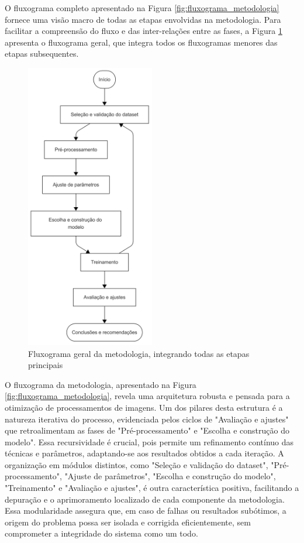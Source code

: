 O fluxograma completo apresentado na Figura \ref{fig:fluxograma_metodologia} fornece uma visão macro de todas as etapas envolvidas na metodologia. Para facilitar a compreensão do fluxo e das inter-relações entre as fases, a Figura \ref{fig:fluxograma_geral} apresenta o fluxograma geral, que integra todos os fluxogramas menores das etapas subsequentes.

\begin{figure}[H]
    \centering
    \caption{\label{fig:fluxograma_geral}Fluxograma geral da metodologia, integrando todas as etapas principais}
    \includegraphics[width=0.5\textwidth]{img/metodologia - geral.png}
\end{figure}

O fluxograma da metodologia, apresentado na Figura \ref{fig:fluxograma_metodologia}, revela uma arquitetura robusta e pensada para a otimização de processamentos de imagens. Um dos pilares desta estrutura é a natureza iterativa do processo, evidenciada pelos ciclos de "Avaliação e ajustes" que retroalimentam as fases de "Pré-processamento" e "Escolha e construção do modelo". Essa recursividade é crucial, pois permite um refinamento contínuo das técnicas e parâmetros, adaptando-se aos resultados obtidos a cada iteração. A organização em módulos distintos, como "Seleção e validação do dataset", "Pré-processamento", "Ajuste de parâmetros", "Escolha e construção do modelo", "Treinamento" e "Avaliação e ajustes", é outra característica positiva, facilitando a depuração e o aprimoramento localizado de cada componente da metodologia. Essa modularidade assegura que, em caso de falhas ou resultados subótimos, a origem do problema possa ser isolada e corrigida eficientemente, sem comprometer a integridade do sistema como um todo.


